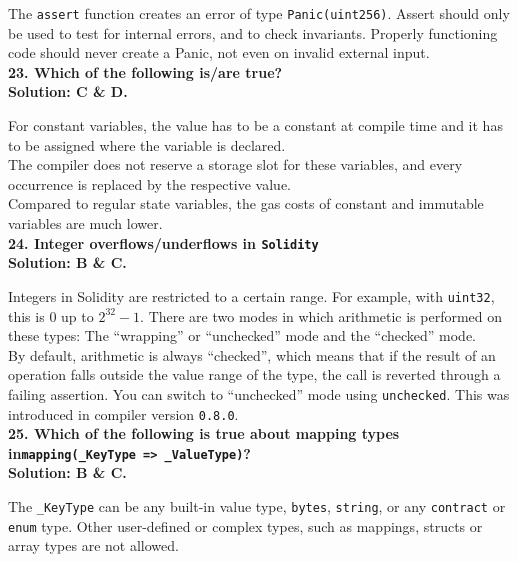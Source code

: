 The \verb|assert| function creates an error of type \verb|Panic(uint256)|.
Assert should only be used to test for internal errors, and to check invariants.
Properly functioning code should never create a Panic, not even on invalid external input.\\

\textbf{23. Which of the following is/are true?}\label{sec:exam2_q23}\\

\textbf{Solution: C \& D.}

For constant variables, the value has to be a constant at compile time and it has to be assigned where the variable is declared.\\
The compiler does not reserve a storage slot for these variables, and every occurrence is replaced by the respective value.\\
Compared to regular state variables, the gas costs of constant and immutable variables are much lower.\\

\textbf{24. Integer overflows/underflows in \texttt{Solidity}}\label{sec:exam2_q24}\\

\textbf{Solution: B \& C.}

Integers in Solidity are restricted to a certain range.
For example, with \verb|uint32|, this is $0$ up to $2^{32} - 1$.
There are two modes in which arithmetic is performed on these types: The ``wrapping'' or ``unchecked'' mode and the ``checked'' mode.\\
By default, arithmetic is always ``checked'', which means that if the result of an operation falls outside the value range of the type, the call is reverted through a failing assertion.
You can switch to ``unchecked'' mode using \verb|unchecked|.
This was introduced in compiler version \verb|0.8.0|.\\

\textbf{25. Which of the following is true about mapping types in\linebreak\texttt{mapping(\_KeyType => \_ValueType)}?}\label{sec:exam2_q25}\\

\textbf{Solution: B \& C.}

The \verb|_KeyType| can be any built-in value type, \verb|bytes|, \verb|string|, or any \verb|contract| or \verb|enum| type.
Other user-defined or complex types, such as mappings, structs or array types are not allowed.\\

